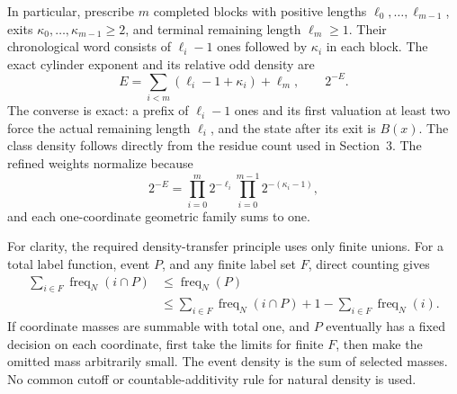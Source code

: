 \documentclass[11pt,letterpaper]{article}
\begin{document}
In particular, prescribe $m$ completed blocks with positive lengths
$\ell_0,\ldots,\ell_{m-1}$, exits $\kappa_0,\ldots,\kappa_{m-1}\ge2$, and
terminal remaining length $\ell_m\ge1$. Their chronological word consists
of $\ell_i-1$ ones followed by $\kappa_i$ in each block. The exact cylinder
exponent and its relative odd density are
\[
 E=\sum_{i<m}(\ell_i-1+\kappa_i)+\ell_m,\qquad 2^{-E}.
\]
The converse is exact: a prefix of $\ell_i-1$ ones and its first valuation
at least two force the actual remaining length $\ell_i$, and the state
after its exit is $B(x)$. The class density follows directly from the
residue count used in Section~3. The refined weights normalize because
\[
 2^{-E}=\prod_{i=0}^{m}2^{-\ell_i}
             \prod_{i=0}^{m-1}2^{-(\kappa_i-1)},
\]
and each one-coordinate geometric family sums to one.

For clarity, the required density-transfer principle uses only finite unions.
For a total label function, event $P$, and any finite label set $F$, direct
counting gives
\begin{align*}
 \sum_{i\in F}\operatorname{freq}_N(i\cap P)
 &\le\operatorname{freq}_N(P)\\
 &\le\sum_{i\in F}\operatorname{freq}_N(i\cap P)
                    +1-\sum_{i\in F}\operatorname{freq}_N(i).
\end{align*}
If coordinate masses are summable with total one, and $P$ eventually has a
fixed decision on each coordinate, first take the limits for finite $F$,
then make the omitted mass arbitrarily small. The event density is the sum
of selected masses. No common cutoff or countable-additivity rule for
natural density is used.
\end{document}
